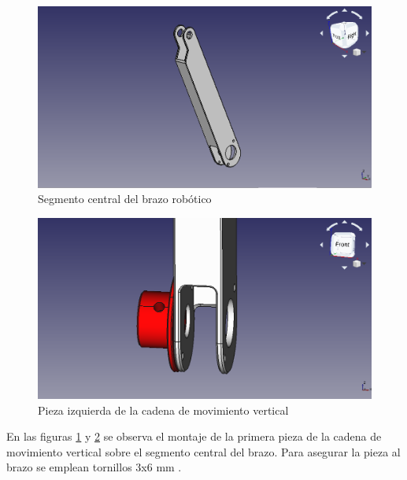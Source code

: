 \begin{figure}[H]
    \centering 
    \includegraphics[width=1\linewidth]{pictures/SegmentoCentralBrazo.png}
    \caption{Segmento central del brazo robótico}
    \label{fig:segmento_central_brazo}
\end{figure}

\begin{figure}[H]
    \centering 
    \includegraphics[width=1\linewidth]{pictures/SoporteMotorIzquierdo.png}
    \caption{Pieza izquierda de la cadena de movimiento vertical}
    \label{fig:pieza_izquierda_brazo}
\end{figure}

En las figuras \ref{fig:segmento_central_brazo} y \ref{fig:pieza_izquierda_brazo} se observa el montaje de la primera pieza de la cadena de movimiento vertical sobre el segmento central del brazo. Para asegurar la pieza al brazo se emplean tornillos 3x6 mm .

